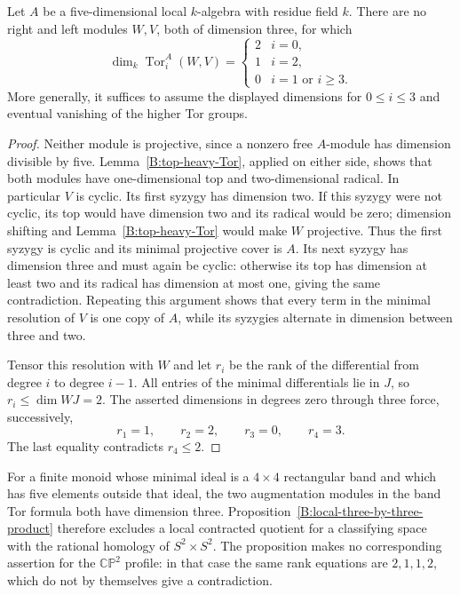 \begin{proposition}\label{B:local-three-by-three-product}
Let $A$ be a five-dimensional local $k$-algebra with residue field $k$.
There are no right and left modules $W,V$, both of dimension three, for
which
\[
 \dim_k\operatorname{Tor}^A_i(W,V)=
 \begin{cases}2&i=0,\\1&i=2,\\0&i=1\text{ or }i\geq3.\end{cases}
\]
More generally, it suffices to assume the displayed dimensions for
$0\leq i\leq3$ and eventual vanishing of the higher Tor groups.
\end{proposition}
\begin{proof}
Neither module is projective, since a nonzero free $A$-module has
dimension divisible by five.  Lemma~\ref{B:top-heavy-Tor}, applied on
either side, shows that both modules have one-dimensional top and
two-dimensional radical.  In particular $V$ is cyclic.  Its first
syzygy has dimension two.  If this syzygy were not cyclic, its top
would have dimension two and its radical would be zero; dimension
shifting and Lemma~\ref{B:top-heavy-Tor} would make $W$ projective.
Thus the first syzygy is cyclic and its minimal projective cover is
$A$.  Its next syzygy has dimension three and must again be cyclic:
otherwise its top has dimension at least two and its radical has
dimension at most one, giving the same contradiction.  Repeating
this argument shows that every term in the minimal resolution of
$V$ is one copy of $A$, while its syzygies alternate in dimension
between three and two.

Tensor this resolution with $W$ and let $r_i$ be the rank of the
differential from degree $i$ to degree $i-1$.  All entries of the
minimal differentials lie in $J$, so $r_i\leq\dim WJ=2$.  The asserted
dimensions in degrees zero through three force, successively,
\[
 r_1=1,\qquad r_2=2,\qquad r_3=0,\qquad r_4=3.
\]
The last equality contradicts $r_4\leq2$.
\end{proof}

\begin{remark}\label{B:local-three-by-three-scope}
For a finite monoid whose minimal ideal is a $4\times4$ rectangular
band and which has five elements outside that ideal, the two
augmentation modules in the band Tor formula both have dimension
three.  Proposition~\ref{B:local-three-by-three-product} therefore
excludes a local contracted quotient for a classifying space with
the rational homology of $S^2\times S^2$.  The proposition makes no
corresponding assertion for the $\mathbb{CP}^2$ profile: in that case
the same rank equations are $2,1,1,2$, which do not by themselves
give a contradiction.
\end{remark}
